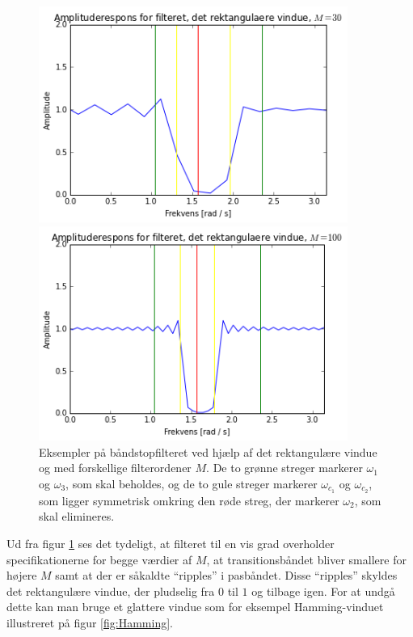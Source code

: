 \begin{figure}[H]
\begin{minipage}{0.49\textwidth}
\includegraphics[width=0.9\textwidth]{figures/Filter_rekt_30.PNG}
\end{minipage}
\begin{minipage}{0.49\textwidth}
\includegraphics[width=0.9\textwidth]{figures/Filter_rekt_100.PNG}
\end{minipage}
\caption{Eksempler på båndstopfilteret ved hjælp af det rektangulære vindue og med forskellige filterordener $M$. De to grønne streger markerer $\omega_1$ og $\omega_3$, som skal beholdes, og de to gule streger markerer $\omega_{c_1}$ og $\omega_{c_2}$, som ligger symmetrisk omkring den røde streg, der markerer $\omega_2$, som skal elimineres.}
\label{fig:filter_rekt}
\end{figure}

Ud fra figur \ref{fig:filter_rekt} ses det tydeligt, at filteret til en vis grad overholder specifikationerne for begge værdier af $M$, at transitionsbåndet bliver smallere for højere $M$ samt at der er såkaldte ``ripples'' i pasbåndet. Disse ``ripples'' skyldes det rektangulære vindue, der pludselig fra $0$ til $1$ og tilbage igen. For at undgå dette kan man bruge et glattere vindue som for eksempel Hamming-vinduet illustreret på figur \ref{fig:Hamming}.